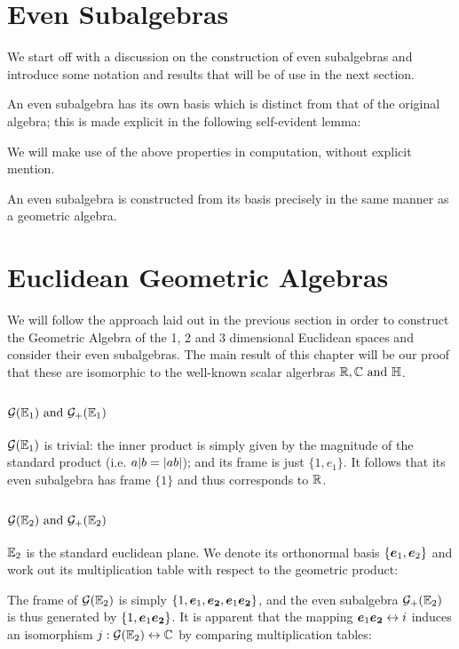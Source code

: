 \section{Even Subalgebras}
We start off with a discussion on the construction of even subalgebras and introduce some notation and results that will be of use in the next section.

An even subalgebra has its own basis which is distinct from that of the original algebra; this is made explicit in the following self-evident lemma:

We will make use of the above properties in computation, without explicit mention.

An even subalgebra is constructed from its basis precisely in the same manner as a geometric algebra.

\newpage

\section{Euclidean Geometric Algebras}
We will follow the approach laid out in the previous section in order to construct the Geometric Algebra of the 1, 2 and 3 dimensional Euclidean spaces and consider their even subalgebras.
The main result of this chapter will be our proof that these are isomorphic to the well-known scalar algerbras $\R, \C \mathrm{\ and\ } \HM$.

\subsection{$\G(\E_1)\ \mathrm{and}\ \G_+(\E_1)$}

$\mathcal{G}(\mathbb{E}_1)$  is trivial: the inner product is simply given by the magnitude of the standard product (i.e. $a | b = \left|ab\right|$); and its frame is just $\{1, e_1\}$.
It follows that its even subalgebra has frame $\{1\}$ and thus corresponds to $\mathbb{R}$.

\subsection{$\G(\E_2)\ \mathrm{and}\ \G_+(\E_2)$}

$\mathbb{E}_2$ is the standard euclidean plane. We denote its orthonormal basis $\{\boldsymbol{e}_1, \boldsymbol{e}_2\}$ and work out its multiplication table with respect to the geometric product:


The frame of $\mathcal{G}(\mathbb{E}_2)$ is simply $\{1, \boldsymbol{e}_1, \boldsymbol{e_2}, \boldsymbol{e}_1\boldsymbol{e_2}\}$, and the even subalgebra $\mathcal{G}_+(\mathbb{E}_2)$ is thus generated by $\{1, \boldsymbol{e}_1\boldsymbol{e_2} \}$.
It is apparent that the mapping $\boldsymbol{e}_1\boldsymbol{e_2} \leftrightarrow i$ induces an isomorphism $j : \mathcal{G}(\mathbb{E}_2) \leftrightarrow \mathbb{C}$ by comparing multiplication tables:


